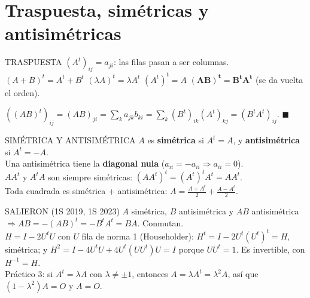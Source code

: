 \section{Traspuesta, simétricas y antisimétricas}
\begin{sello}{TRASPUESTA}
$(A^t)_{ij}=a_{ji}$: las filas pasan a ser columnas.\\[2pt]
$(A+B)^t=A^t+B^t$ \quad $(\lambda A)^t=\lambda A^t$ \quad $(A^t)^t=A$ \quad $\boldsymbol{(AB)^t=B^tA^t}$ (se da vuelta el orden).
\end{sello}
\begin{demo}
$((AB)^t)_{ij}=(AB)_{ji}=\sum_k a_{jk}b_{ki}=\sum_k (B^t)_{ik}(A^t)_{kj}=(B^tA^t)_{ij}$. $\blacksquare$
\end{demo}
\begin{sello}{SIMÉTRICA Y ANTISIMÉTRICA}
$A$ es \textbf{simétrica} si $A^t=A$, y \textbf{antisimétrica} si $A^t=-A$.\\[2pt]
Una antisimétrica tiene la \textbf{diagonal nula} ($a_{ii}=-a_{ii}\Rightarrow a_{ii}=0$).\\[2pt]
$AA^t$ y $A^tA$ son siempre simétricas: $(AA^t)^t=(A^t)^tA^t=AA^t$.\\[2pt]
Toda cuadrada es simétrica + antisimétrica: $A=\frac{A+A^t}2+\frac{A-A^t}2$.
\end{sello}
\begin{memo}{SALIERON (1S 2019, 1S 2023)}
$A$ simétrica, $B$ antisimétrica y $AB$ antisimétrica $\Rightarrow AB=-(AB)^t=-B^tA^t=BA$. Conmutan.\\[2pt]
$H=I-2U^tU$ con $U$ fila de norma 1 (Householder): $H^t=I-2U^t(U^t)^t=H$, simétrica; y $H^2=I-4U^tU+4U^t(UU^t)U=I$ porque $UU^t=1$. Es invertible, con $H^{-1}=H$.\\[2pt]
Práctico 3: si $A^t=\lambda A$ con $\lambda\neq\pm1$, entonces $A=\lambda A^t=\lambda^2A$, así que $(1-\lambda^2)A=O$ y $A=O$.
\end{memo}

